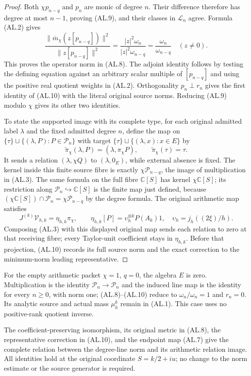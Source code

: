 \documentclass[11pt]{article}
\newcommand{\calP}{\mathcal P}
\newcommand{\calL}{\mathcal L}
\begin{document}
\begin{proof}
Both $\chi p_{n-q}$ and $p_n$ are monic of degree $n$. Their difference
therefore has degree at most $n-1$, proving (AL.9), and their classes in
$\calL_n$ agree. Formula (AL.2) gives
\[
 \frac{\|\overline m_\chi(z[p_{n-q}])\|^2}{\|z[p_{n-q}]\|^2}
 =\frac{|z|^2\omega_n}{|z|^2\omega_{n-q}}
 =\frac{\omega_n}{\omega_{n-q}}\quad(z\ne0).
\]
This proves the operator norm in (AL.8). The adjoint identity follows by
testing the defining equation against an arbitrary scalar multiple of
$[p_{n-q}]$ and using the positive real quotient weights in (AL.2).
Orthogonality $p_n\perp r_n$ gives the first identity of (AL.10) with the
literal original source norms. Reducing (AL.9) modulo $\chi$ gives its other
two identities.

To state the supported image with its complete type, for each original
admitted label $\lambda$ and the fixed admitted degree $n$, define the map
on $\{\tau\}\sqcup\{(\lambda,P):P\in\calP_n\}$ with target
$\{\tau\}\sqcup\{(\lambda,x):x\in E\}$ by
\[
 \widetilde\pi_\chi(\lambda,P)=(\lambda,\pi_\chi P),
 \qquad \widetilde\pi_\chi(\tau)=\tau.
\]
It sends a relation $(\lambda,\chi Q)$ to $(\lambda,0_E)$, while external
absence is fixed. The kernel inside this finite source fibre is exactly
$\chi\calP_{n-q}$, the image of multiplication in (AL.3). The same formula
on the full fibre $\mathbb C[S]$ has kernel $\chi\mathbb C[S]$;
its restriction along $\calP_n\hookrightarrow\mathbb C[S]$ is the finite
map just defined, because
$(\chi\mathbb C[S])\cap\calP_n=\chi\calP_{n-q}$ by the degree formula.
The original arithmetic map satisfies
\begin{equation}\tag{AL.11}
 J^{(k)}\mathcal V_{h,k}=\eta_{h,k}\pi_\chi,\qquad
 \eta_{h,k}[P]=\upsilon_h^{\otimes k}P(A_k)1,
 \quad \upsilon_h=j_h((2\xi)/h).
\end{equation}
Composing (AL.3) with this displayed original map sends each relation to
zero at that receiving fibre; every Taylor-unit coefficient stays in
$\eta_{h,k}$. Before that projection, (AL.10) records its full source norm
and the exact correction to the minimum-norm leading representative.
\end{proof}

For the empty arithmetic packet $\chi=1$, $q=0$, the algebra $E$ is zero.
Multiplication is the identity $\calP_n\to\calP_n$ and the induced line map
is the identity for every $n\ge0$, with norm one; (AL.8)--(AL.10) reduce to
$\omega_n/\omega_n=1$ and $r_n=0$. Its analytic source and actual mass
$\mu_h^k$ remain in (AL.1). This case uses no positive-rank quotient inverse.

The coefficient-preserving isomorphism, its original metric in (AL.8), the
representative correction in (AL.10), and the endpoint map (AL.7) give the
complete relation between the degree-line norm and its arithmetic relation
image. All identities hold at the original coordinate $S=k/2+iu$; no change
to the norm estimate or the source generator is required.
\end{document}

